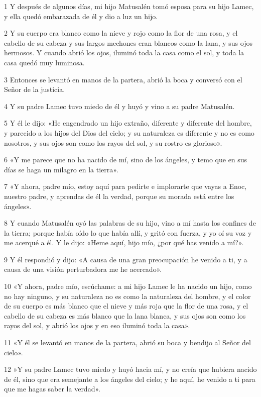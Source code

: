 \par 1 Y después de algunos días, mi hijo Matusalén tomó esposa para su hijo Lamec, y ella quedó embarazada de él y dio a luz un hijo.
\par 2 Y su cuerpo era blanco como la nieve y rojo como la flor de una rosa, y el cabello de su cabeza y sus largos mechones eran blancos como la lana, y sus ojos hermosos. Y cuando abrió los ojos, iluminó toda la casa como el sol, y toda la casa quedó muy luminosa.
\par 3 Entonces se levantó en manos de la partera, abrió la boca y conversó con el Señor de la justicia.
\par 4 Y su padre Lamec tuvo miedo de él y huyó y vino a su padre Matusalén.
\par 5 Y él le dijo: «He engendrado un hijo extraño, diferente y diferente del hombre, y parecido a los hijos del Dios del cielo; y su naturaleza es diferente y no es como nosotros, y sus ojos son como los rayos del sol, y su rostro es glorioso».
\par 6 «Y me parece que no ha nacido de mí, sino de los ángeles, y temo que en sus días se haga un milagro en la tierra».
\par 7 «Y ahora, padre mío, estoy aquí para pedirte e implorarte que vayas a Enoc, nuestro padre, y aprendas de él la verdad, porque su morada está entre los ángeles».
\par 8 Y cuando Matusalén oyó las palabras de su hijo, vino a mí hasta los confines de la tierra; porque había oído lo que había allí, y gritó con fuerza, y yo oí su voz y me acerqué a él. Y le dijo: «Heme aquí, hijo mío, ¿por qué has venido a mí?».
\par 9 Y él respondió y dijo: «A causa de una gran preocupación he venido a ti, y a causa de una visión perturbadora me he acercado».
\par 10 «Y ahora, padre mío, escúchame: a mi hijo Lamec le ha nacido un hijo, como no hay ninguno, y su naturaleza no es como la naturaleza del hombre, y el color de su cuerpo es más blanco que el nieve y más roja que la flor de una rosa, y el cabello de su cabeza es más blanco que la lana blanca, y sus ojos son como los rayos del sol, y abrió los ojos y en eso iluminó toda la casa».
\par 11 «Y él se levantó en manos de la partera, abrió su boca y bendijo al Señor del cielo».
\par 12 »Y su padre Lamec tuvo miedo y huyó hacia mí, y no creía que hubiera nacido de él, sino que era semejante a los ángeles del cielo; y he aquí, he venido a ti para que me hagas saber la verdad».
